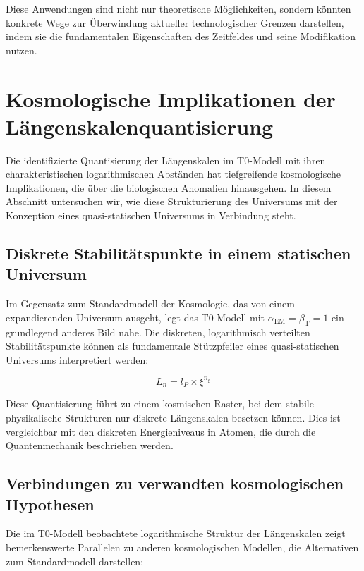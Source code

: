 \documentclass[12pt,a4paper]{article}
\newcommand{\alphaEM}{\alpha_{\text{EM}}}
\newcommand{\betaT}{\beta_{\text{T}}}
\begin{document}
	Diese Anwendungen sind nicht nur theoretische Möglichkeiten, sondern könnten konkrete Wege zur Überwindung aktueller technologischer Grenzen darstellen, indem sie die fundamentalen Eigenschaften des Zeitfeldes und seine Modifikation nutzen.
	
	\section{Kosmologische Implikationen der Längenskalenquantisierung}
	\label{sec:kosmologische_implikationen}
	
	Die identifizierte Quantisierung der Längen\-skalen im T0-Modell mit ihren charakteristischen logarithmischen Abständen hat tiefgreifende kosmologische Implikationen, die über die biologischen Anomalien hinausgehen. In diesem Abschnitt untersuchen wir, wie diese Strukturierung des Universums mit der Konzeption eines quasi-statischen Universums in Verbindung steht.
	
	\subsection{Diskrete Stabilitätspunkte in einem statischen Universum}
	\label{subsec:stabilitaetspunkte}
	
	Im Gegensatz zum Standardmodell der Kosmologie, das von einem expandierenden Universum ausgeht, legt das T0-Modell mit $\alphaEM = \betaT = 1$ ein grundlegend anderes Bild nahe. Die diskreten, logarithmisch verteilten Stabilitäts\-punkte können als fundamentale \glqq Stützpfeiler\grqq{} eines quasi-statischen Universums interpretiert werden:
	
	\begin{equation}
		\label{eq:laengenquantisierung}
		L_n = l_P \times \xi^{n_\xi}
	\end{equation}
	
	Diese Quantisierung führt zu einem \glqq kosmischen Raster\grqq{}, bei dem stabile physikalische Strukturen nur diskrete Längen\-skalen besetzen können. Dies ist vergleichbar mit den diskreten Energieniveaus in Atomen, die durch die Quantenmechanik beschrieben werden.
	
	\subsection{Verbindungen zu verwandten kosmologischen Hypothesen}
	\label{subsec:verwandte_hypothesen}
	
	Die im T0-Modell beobachtete logarithmische Struktur der Längen\-skalen zeigt bemerkenswerte Parallelen zu anderen kosmologischen Modellen, die Alternativen zum Standardmodell darstellen:
	
\end{document}
